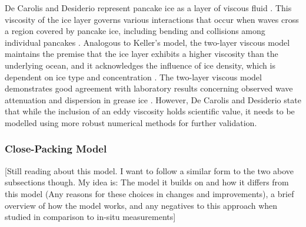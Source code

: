 
De Carolis and Desiderio \cite{DeCarolis2002} represent pancake ice as a layer of viscous fluid \cite{DeCarolis2002,Doble2015}. This viscosity of the ice layer governs various interactions that occur when waves cross a region covered by pancake ice, including bending and collisions among individual pancakes \cite{Doble2015}. Analogous to Keller's model, the two-layer viscous model maintains the premise that the ice layer exhibits a higher viscosity than the underlying ocean, and it acknowledges the influence of ice density, which is dependent on ice type and concentration \cite{DeCarolis2002,Doble2015}. The two-layer viscous model demonstrates good agreement with laboratory results concerning observed wave attenuation and dispersion in grease ice \cite{DeCarolis2002}. However, De Carolis and Desiderio \cite{DeCarolis2002} state that while the inclusion of an eddy viscosity holds scientific value, it needs to be modelled using more robust numerical methods for further validation.

\subsubsection{Close-Packing Model} \label{subsubsec:litReview.sarCharac.seaIceWaveModelling.CP}

[Still reading about this model. I want to follow a similar form to the two above subsections though. My idea is: The model it builds on and how it differs from this model (Any reasons for these choices in changes and improvements), a brief overview of how the model works, and any negatives to this approach when studied in comparison to in-situ measurements]

